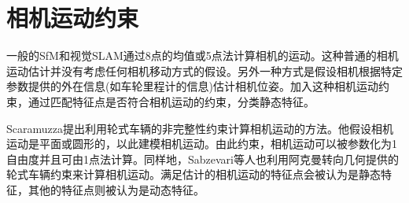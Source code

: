 \section{相机运动约束}
一般的SfM和视觉SLAM通过8点的均值\cite{Longuet1981A}或5点法\cite{David2004An}计算相机的运动。这种普通的相机运动估计并没有考虑任何相机移动方式的假设。另外一种方式是假设相机根据特定参数提供的外在信息(如车轮里程计的信息)估计相机位姿。加入这种相机运动约束，通过匹配特征点是否符合相机运动的约束，分类静态特征。

Scaramuzza\cite{scaramuzza20111A}提出利用轮式车辆的非完整性约束计算相机运动的方法。他假设相机运动是平面或圆形的，以此建模相机运动。由此约束，相机运动可以被参数化为1自由度并且可由1点法计算\cite{scaramuzza2009realA}。同样地，Sabzevari等人\cite{sabzevari2016multiA}也利用阿克曼转向几何提供的轮式车辆约束来计算相机运动。满足估计的相机运动的特征点会被认为是静态特征，其他的特征点则被认为是动态特征。
